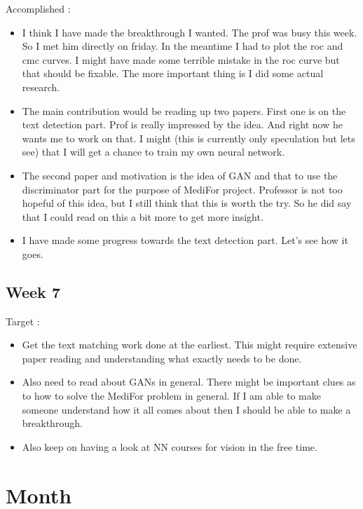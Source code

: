 \documentclass{article}
\begin{document}
Accomplished :
\begin{itemize}
\item I think I have made the breakthrough I wanted. The prof was busy this week. So I met him directly on friday. In the meantime I had to plot the roc and cmc curves. I might have made some terrible mistake in the roc curve but that should be fixable. The more important thing is I did some actual research.
\item The main contribution would be reading up two papers. First one is on the text detection part. Prof is really impressed by the idea. And right now he wants me to work on that. I might (this is currently only speculation but lets see) that I will get a chance to train my own neural network.
\item The second paper and motivation is the idea of GAN and that to use the discriminator part for the purpose of MediFor project. Professor is not too hopeful of this idea, but I still think that this is worth the try. So he did say that I could read on this a bit more to get more insight.
\item I have made some progress towards the text detection part. Let's see how it goes.
\end{itemize}

\subsection{Week 7}
Target :
\begin{itemize}
\item Get the text matching work done at the earliest. This might require extensive paper reading and understanding what exactly needs to be done.
\item Also need to read about GANs in general. There might be important clues as to how to solve the MediFor problem in general. If I am able to make someone understand how it all comes about then I should be able to make a breakthrough.
\item Also keep on having a look at NN courses for vision in the free time.
\end{itemize}
\section{Month}
\end{document}
